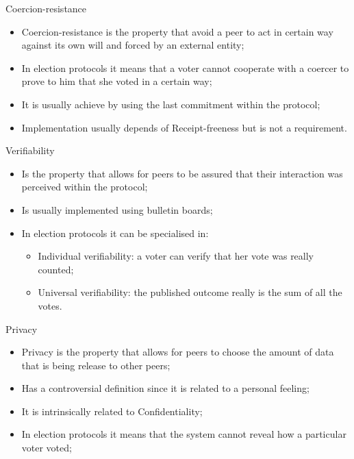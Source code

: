 \documentclass[12pt,table,xcolor={dvipsnames}]{beamer}
\begin{document}
\begin{frame}{Coercion-resistance}
\begin{itemize}
\item Coercion-resistance is the property that avoid a peer to act in certain way against its own will and forced by an external entity;\pause
\item In election protocols it means that a voter cannot cooperate with a coercer to prove to him that she voted in a certain way;\pause
\item It is usually achieve by using the last commitment within the protocol;\pause
\item Implementation usually depends of Receipt-freeness but is not a requirement.
\end{itemize}
\end{frame}

\begin{frame}{Verifiability}
\begin{itemize}
\item Is the property that allows for peers to be assured that their interaction was perceived within the protocol;\pause
\item Is usually implemented using bulletin boards;\pause
\item In election protocols it can be specialised in:\pause
\begin{itemize}
\item Individual verifiability: a voter can verify that her vote was really counted;\pause
\item Universal verifiability: the published outcome really is the sum of all the votes.
\end{itemize}
\end{itemize}
\end{frame}

\begin{frame}{Privacy}
\begin{itemize}
\item Privacy is the property that allows for peers to choose the amount of data that is being release to other peers;\pause
\item Has a controversial definition since it is related to a personal feeling;\pause
\item It is intrinsically related to Confidentiality;\pause
\item In election protocols it means that the system cannot reveal how a particular voter voted;\pause
\end{itemize}
\end{frame}
\end{document}
